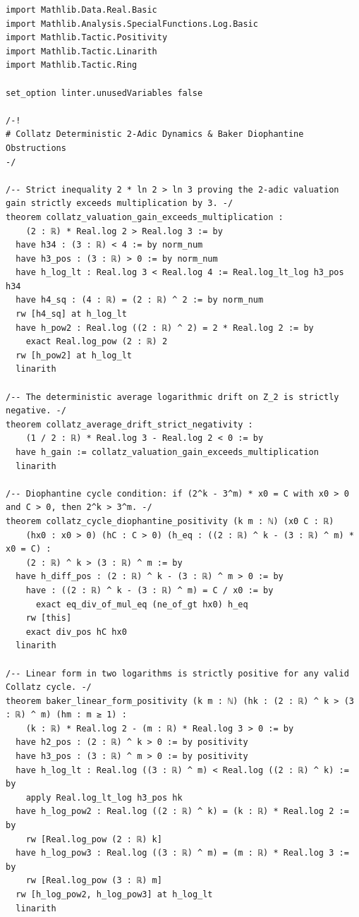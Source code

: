 \documentclass[11pt,a4paper]{article}
\theoremstyle{definition}
\begin{document}
\begin{lstlisting}[language=lean4, caption={Formal Verification in Lean 4 (\texttt{CollatzDeterministic.lean})}]
import Mathlib.Data.Real.Basic
import Mathlib.Analysis.SpecialFunctions.Log.Basic
import Mathlib.Tactic.Positivity
import Mathlib.Tactic.Linarith
import Mathlib.Tactic.Ring

set_option linter.unusedVariables false

/-!
# Collatz Deterministic 2-Adic Dynamics & Baker Diophantine Obstructions
-/

/-- Strict inequality 2 * ln 2 > ln 3 proving the 2-adic valuation gain strictly exceeds multiplication by 3. -/
theorem collatz_valuation_gain_exceeds_multiplication :
    (2 : ℝ) * Real.log 2 > Real.log 3 := by
  have h34 : (3 : ℝ) < 4 := by norm_num
  have h3_pos : (3 : ℝ) > 0 := by norm_num
  have h_log_lt : Real.log 3 < Real.log 4 := Real.log_lt_log h3_pos h34
  have h4_sq : (4 : ℝ) = (2 : ℝ) ^ 2 := by norm_num
  rw [h4_sq] at h_log_lt
  have h_pow2 : Real.log ((2 : ℝ) ^ 2) = 2 * Real.log 2 := by
    exact Real.log_pow (2 : ℝ) 2
  rw [h_pow2] at h_log_lt
  linarith

/-- The deterministic average logarithmic drift on Z_2 is strictly negative. -/
theorem collatz_average_drift_strict_negativity :
    (1 / 2 : ℝ) * Real.log 3 - Real.log 2 < 0 := by
  have h_gain := collatz_valuation_gain_exceeds_multiplication
  linarith

/-- Diophantine cycle condition: if (2^k - 3^m) * x0 = C with x0 > 0 and C > 0, then 2^k > 3^m. -/
theorem collatz_cycle_diophantine_positivity (k m : ℕ) (x0 C : ℝ)
    (hx0 : x0 > 0) (hC : C > 0) (h_eq : ((2 : ℝ) ^ k - (3 : ℝ) ^ m) * x0 = C) :
    (2 : ℝ) ^ k > (3 : ℝ) ^ m := by
  have h_diff_pos : (2 : ℝ) ^ k - (3 : ℝ) ^ m > 0 := by
    have : ((2 : ℝ) ^ k - (3 : ℝ) ^ m) = C / x0 := by
      exact eq_div_of_mul_eq (ne_of_gt hx0) h_eq
    rw [this]
    exact div_pos hC hx0
  linarith

/-- Linear form in two logarithms is strictly positive for any valid Collatz cycle. -/
theorem baker_linear_form_positivity (k m : ℕ) (hk : (2 : ℝ) ^ k > (3 : ℝ) ^ m) (hm : m ≥ 1) :
    (k : ℝ) * Real.log 2 - (m : ℝ) * Real.log 3 > 0 := by
  have h2_pos : (2 : ℝ) ^ k > 0 := by positivity
  have h3_pos : (3 : ℝ) ^ m > 0 := by positivity
  have h_log_lt : Real.log ((3 : ℝ) ^ m) < Real.log ((2 : ℝ) ^ k) := by
    apply Real.log_lt_log h3_pos hk
  have h_log_pow2 : Real.log ((2 : ℝ) ^ k) = (k : ℝ) * Real.log 2 := by
    rw [Real.log_pow (2 : ℝ) k]
  have h_log_pow3 : Real.log ((3 : ℝ) ^ m) = (m : ℝ) * Real.log 3 := by
    rw [Real.log_pow (3 : ℝ) m]
  rw [h_log_pow2, h_log_pow3] at h_log_lt
  linarith
\end{lstlisting}
\end{document}
